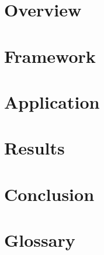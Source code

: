 \documentclass{thesis}
\begin{document}
\frontmatter
\maketitle
\clearpage
\impressum

\cleardoublepage
{}


\cleardoublepage


\tableofcontents

\mainmatter
\chapter{Overview}

\chapter{Framework}

\chapter{Application}

\chapter{Results}

\chapter{Conclusion}

\chapter{Glossary}


\appendix
%

\backmatter

\listoffigures
\listoftables




\clearpage
\erklaerung
\end{document}
